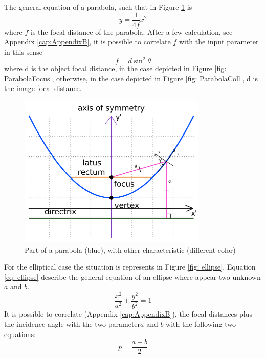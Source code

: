The general equation of a parabola, such that in  Figure \ref{fig: ParabolaSystem} is
%
\begin{equation}
y = \frac{1}{4f} x^2
\label{eq: parabola}
\end{equation}
%
where $f $ is the focal distance of the parabola. After a few calculation, see Appendix \ref{cap:AppendixB}, it is possible to correlate $f $ with the input parameter in this sense
%
\begin{equation}
f = d \sin^2 \theta
\label{eq: parabola2}
\end{equation}
%
where d is the object focal distance, in the case depicted in Figure \ref{fig: ParabolaFocus}, otherwise, in the case depicted in Figure \ref{fig: ParabolaColl}, d is the image focal distance.
%
\begin{figure}[H]
%
\centering
%
\includegraphics[width=0.8\textwidth]{Immagini/Chapter3/Parab}
%
\caption{Part of a parabola (blue), with other characteristic (different color) \cite{wikiParabola}}
%
\label{fig: ParabolaSystem}
%
\end{figure}
For the elliptical case the situation is represents in Figure \ref{fig: ellipse}. Equation \ref{eq: ellipse} describe the general equation of an ellipse where appear two unknown $a$ and $b $.
%
\begin{equation}
\frac{x^2}{a^2} + \frac{y^2}{b^2} = 1
\label{eq: ellipse}
\end{equation}
%
It is possible to correlate (Appendix \ref{cap:AppendixB}), the focal distances plus the incidence angle with the two parameter$a$ and $b $ with the following two equations:
%
\begin{equation}
p = \frac{a + b}{2}
\label{eq: 1stEllipseEq}
\end{equation}
